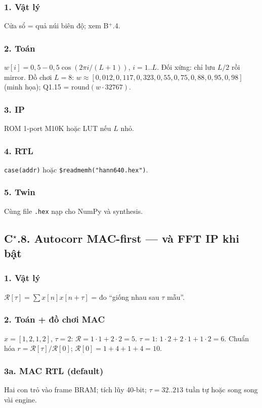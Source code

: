 \subsubsection*{1. Vật lý} Cửa sổ = quả núi biên độ; xem B$^+$.4.

\subsubsection*{2. Toán}
$w[i]=0{,}5-0{,}5\cos(2\pi i/(L+1))$, $i=1..L$. Đối xứng: chỉ lưu $L/2$ rồi mirror.
Đồ chơi $L=8$: $w\approx[0{,}012,0{,}117,0{,}323,0{,}55,0{,}75,0{,}88,0{,}95,0{,}98]$ (minh họa); Q1.15 = $\mathrm{round}(w\cdot32767)$.

\subsubsection*{3. IP} ROM 1-port M10K hoặc LUT nếu $L$ nhỏ.

\subsubsection*{4. RTL} \texttt{case(addr)} hoặc \texttt{\$readmemh("hann640.hex")}.

\subsubsection*{5. Twin} Cùng file \texttt{.hex} nạp cho NumPy và synthesis.

\subsection*{C$^\star$.8. Autocorr MAC-first --- và FFT IP khi bật}

\subsubsection*{1. Vật lý} $\mathcal{R}[\tau]=\sum x[n]x[n+\tau]$ = đo ``giống nhau sau $\tau$ mẫu''.

\subsubsection*{2. Toán + đồ chơi MAC}
$x=[1,2,1,2]$, $\tau=2$: $\mathcal{R}=1\cdot1+2\cdot2=5$. $\tau=1$: $1\cdot2+2\cdot1+1\cdot2=6$.
Chuẩn hóa $r=\mathcal{R}[\tau]/\mathcal{R}[0]$; $\mathcal{R}[0]=1+4+1+4=10$.

\subsubsection*{3a. MAC RTL (default)}
Hai con trỏ vào frame BRAM; tích lũy 40-bit; $\tau=32..213$ tuần tự hoặc song song vài engine.

